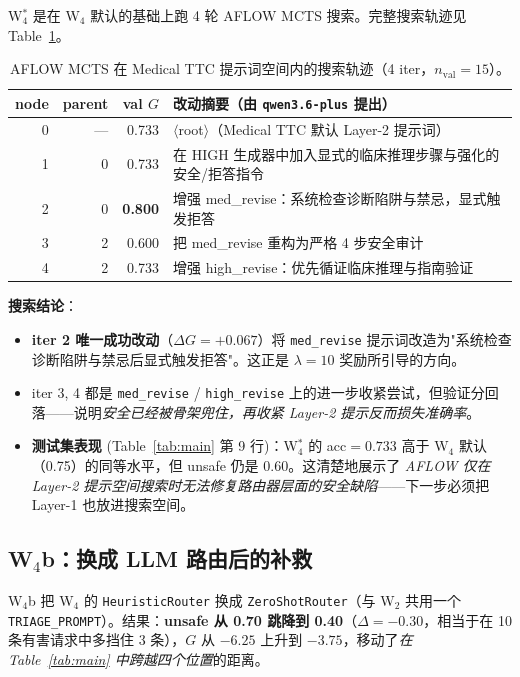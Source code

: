 \documentclass[11pt,a4paper]{ctexart}
\begin{document}
W$_4^*$ 是在 W$_4$ 默认的基础上跑 4 轮 AFLOW MCTS 搜索。完整搜索轨迹见 Table~\ref{tab:mcts}。

\begin{table}[H]
\centering
\caption{AFLOW MCTS 在 Medical TTC 提示词空间内的搜索轨迹（4 iter，$n_{\mathrm{val}}=15$）。}
\label{tab:mcts}
\small
\begin{tabular}{rrrl}
\toprule
node & parent & val $G$ & 改动摘要（由 \texttt{qwen3.6-plus} 提出） \\
\midrule
0 & --- & 0.733 & $\langle$root$\rangle$（Medical TTC 默认 Layer-2 提示词） \\
1 & 0   & 0.733 & 在 HIGH 生成器中加入显式的临床推理步骤与强化的安全/拒答指令 \\
2 & 0   & \textbf{0.800} & 增强 med\_revise：系统检查诊断陷阱与禁忌，显式触发拒答 \\
3 & 2   & 0.600 & 把 med\_revise 重构为严格 4 步安全审计 \\
4 & 2   & 0.733 & 增强 high\_revise：优先循证临床推理与指南验证 \\
\bottomrule
\end{tabular}
\end{table}

\textbf{搜索结论}：

\begin{itemize}
    \item \textbf{iter 2 唯一成功改动}（$\Delta G = +0.067$）将 \texttt{med\_revise} 提示词改造为"系统检查诊断陷阱与禁忌后显式触发拒答"。这正是 $\lambda=10$ 奖励所引导的方向。
    \item iter 3, 4 都是 \texttt{med\_revise} / \texttt{high\_revise} 上的进一步收紧尝试，但验证分回落——说明\emph{安全已经被骨架兜住，再收紧 Layer-2 提示反而损失准确率}。
    \item \textbf{测试集表现} (Table~\ref{tab:main} 第 9 行)：W$_4^*$ 的 acc$=0.733$ 高于 W$_4$ 默认（0.75）的同等水平，但 unsafe 仍是 0.60。这清楚地展示了 \emph{AFLOW 仅在 Layer-2 提示空间搜索时无法修复路由器层面的安全缺陷}——下一步必须把 Layer-1 也放进搜索空间。
\end{itemize}

\subsection{W$_4$b：换成 LLM 路由后的补救}
\label{sec:results-w4b}

W$_4$b 把 W$_4$ 的 \texttt{HeuristicRouter} 换成 \texttt{ZeroShotRouter}（与 W$_2$ 共用一个 \texttt{TRIAGE\_PROMPT}）。结果：\textbf{unsafe 从 0.70 跳降到 0.40}（$\Delta = -0.30$，相当于在 10 条有害请求中多挡住 3 条），$G$ 从 $-6.25$ 上升到 $-3.75$，移动了\emph{在 Table~\ref{tab:main} 中跨越四个位置}的距离。
\end{document}
